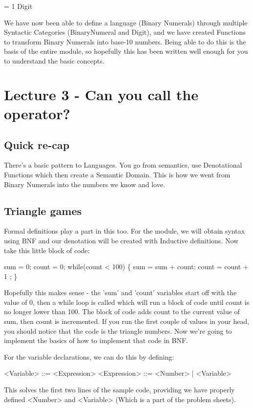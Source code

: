\documentclass[12pt]{article}
\begin{document}
\textrbrackdbl              = 1
   Digit

We have now been able to define a language (Binary Numerals) through multiple
Syntactic Categories (BinaryNumeral and Digit), and we have created Functions
to transform Binary Numerals into base-10 numbers.  Being able to do this is
the basis of the entire module, so hopefully this has been written well enough
for you to understand the basic concepts.

\section{Lecture 3 - Can you call the operator?}
\label{sec-3}

\subsection{Quick re-cap}
\label{sec-3-1}
There's a basic pattern to Languages.  You go from semantics, use Denotational
Functions which then create a Semantic Domain.  This is how we went from Binary
Numerals into the numbers we know and love.

\subsection{Triangle games}
\label{sec-3-2}
Formal definitions play a part in this too.  For the module, we will obtain
syntax using BNF and our denotation will be created with Inductive definitions.
Now take this little block of code:

sum   = 0;
count = 0;
while(count < 100) \{
  sum   = sum   + count;
  count = count + 1    ;
\}

Hopefully this makes sense - the 'sum' and 'count' variables start off with the
value of 0, then a while loop is called which will run a block of code until
count is no longer lower than 100.  The block of code adds count to the current
value of sum, then count is incremented.  If you run the first couple of values
in your head, you should notice that the code is the triangle numbers.  Now
we're going to implement the basics of how to implement that code in BNF.

For the variable declarations, we can do this by defining:

<Variable>   ::= <Expression>
<Expression> ::= <Number> | <Variable>

This solves the first two lines of the sample code, providing we have properly
defined <Number> and <Variable> (Which is a part of the problem sheets).
\end{document}
